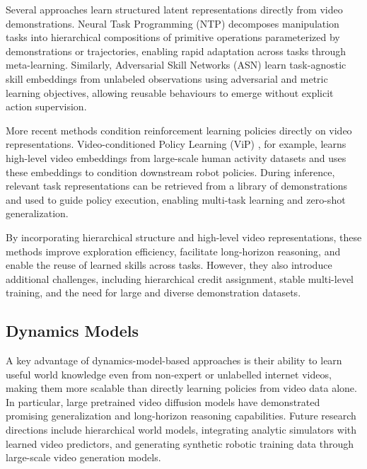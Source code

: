 Several approaches learn structured latent representations directly from video demonstrations. Neural Task Programming (NTP) \cite{139} decomposes manipulation tasks into hierarchical compositions of primitive operations parameterized by demonstrations or trajectories, enabling rapid adaptation across tasks through meta-learning. Similarly, Adversarial Skill Networks (ASN) \cite{140} learn task-agnostic skill embeddings from unlabeled observations using adversarial and metric learning objectives, allowing reusable behaviours to emerge without explicit action supervision.

More recent methods condition reinforcement learning policies directly on video representations. Video-conditioned Policy Learning (ViP) \cite{141}, for example, learns high-level video embeddings from large-scale human activity datasets and uses these embeddings to condition downstream robot policies. During inference, relevant task representations can be retrieved from a library of demonstrations and used to guide policy execution, enabling multi-task learning and zero-shot generalization.

By incorporating hierarchical structure and high-level video representations, these methods improve exploration efficiency, facilitate long-horizon reasoning, and enable the reuse of learned skills across tasks. However, they also introduce additional challenges, including hierarchical credit assignment, stable multi-level training, and the need for large and diverse demonstration datasets.















\subsection{Dynamics Models}

A key advantage of dynamics-model-based approaches is their ability to learn useful world knowledge even from non-expert or unlabelled internet videos, making them more scalable than directly learning policies from video data alone. In particular, large pretrained video diffusion models have demonstrated promising generalization and long-horizon reasoning capabilities. Future research directions include hierarchical world models, integrating analytic simulators with learned video predictors, and generating synthetic robotic training data through large-scale video generation models.





















